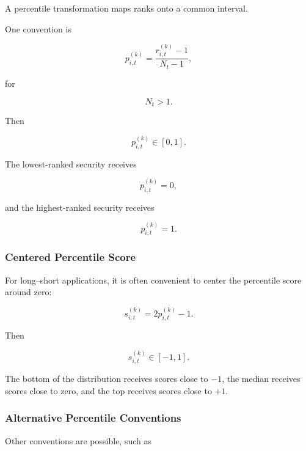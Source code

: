 \documentclass[11pt,a4paper]{article}
\begin{document}
A percentile transformation maps ranks onto a common interval.

One convention is

\begin{equation}
\boxed{
p_{i,t}^{(k)}
=
\frac{
r_{i,t}^{(k)}-1
}{
N_t-1
},
}
\end{equation}

for

\begin{equation}
N_t>1.
\end{equation}

Then

\begin{equation}
p_{i,t}^{(k)}
\in
[0,1].
\end{equation}

The lowest-ranked security receives

\begin{equation}
p_{i,t}^{(k)}=0,
\end{equation}

and the highest-ranked security receives

\begin{equation}
p_{i,t}^{(k)}=1.
\end{equation}


\subsubsection{Centered Percentile Score}

For long--short applications, it is often convenient to center the percentile
score around zero:

\begin{equation}
\boxed{
s_{i,t}^{(k)}
=
2p_{i,t}^{(k)}-1.
}
\end{equation}

Then

\begin{equation}
s_{i,t}^{(k)}
\in
[-1,1].
\end{equation}

The bottom of the distribution receives scores close to $-1$, the median
receives scores close to zero, and the top receives scores close to $+1$.


\subsubsection{Alternative Percentile Conventions}

Other conventions are possible, such as
\end{document}

